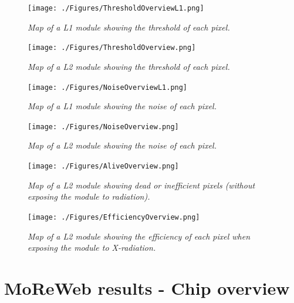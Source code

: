 \documentclass[a4paper,12pt,twoside]{article}
\begin{document}
\begin{appendices}
\begin{figure} [h!] \centering 
\texttt{[image: ./Figures/ThresholdOverviewL1.png]}
\caption{\em  \label{ThresholdOverviewL1} 
Map of a L1 module showing the threshold of each pixel.}
\end{figure}

\begin{figure} [h!] \centering 
\texttt{[image: ./Figures/ThresholdOverview.png]}
\caption{\em  \label{ThresholdOverview} 
Map of a L2 module showing the threshold of each pixel.}
\end{figure}

\begin{figure} [h!] \centering 
\texttt{[image: ./Figures/NoiseOverviewL1.png]}
\caption{\em  \label{NoiseOverviewL1} 
Map of a L1 module showing the noise of each pixel.}
\end{figure}

\begin{figure} [h!] \centering 
\texttt{[image: ./Figures/NoiseOverview.png]}
\caption{\em  \label{NoiseOverview} 
Map of a L2 module showing the noise of each pixel.}
\end{figure}

\begin{figure} [h!] \centering 
\texttt{[image: ./Figures/AliveOverview.png]}
\caption{\em  \label{AliveOverview} 
Map of a L2 module showing dead or inefficient pixels (without exposing the module to radiation).}
\end{figure}

\begin{figure} [h!] \centering 
\texttt{[image: ./Figures/EfficiencyOverview.png]}
\caption{\em  \label{EfficiencyOverview} 
Map of a L2 module showing the efficiency of each pixel when exposing the module to X-radiation.}
\end{figure}


\section{MoReWeb results - Chip overview} \label{ChipOverview}


\end{appendices}
\end{document}
